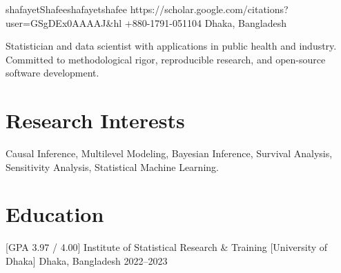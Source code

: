 \documentclass[letterpaper,11pt]{article}
\begin{document}


           {shafayetShafee}{shafayetshafee}
           {https://scholar.google.com/citations?user=GSgDEx0AAAAJ&hl}
           {+880-1791-051104}
           {Dhaka, Bangladesh}



\medskip

Statistician and data scientist with applications in public health and industry.
Committed to methodological rigor, reproducible research, and open-source
software development.

\vspace{-2pt}



\section*{Research Interests}

Causal Inference, Multilevel Modeling, Bayesian Inference, Survival Analysis,
Sensitivity Analysis, Statistical Machine Learning.



\section*{Education}

[GPA 3.97 / 4.00]
{Institute of Statistical Research \& Training}
[University of Dhaka]
{Dhaka, Bangladesh}
{2022--2023}
\end{document}
